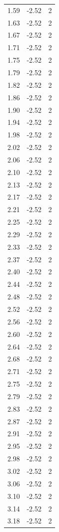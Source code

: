 \begin{longtable}{lrr}
  1.59 & -2.52 & 2 \\
  1.63 & -2.52 & 2 \\
  1.67 & -2.52 & 2 \\
  1.71 & -2.52 & 2 \\
  1.75 & -2.52 & 2 \\
  1.79 & -2.52 & 2 \\
  1.82 & -2.52 & 2 \\
  1.86 & -2.52 & 2 \\
  1.90 & -2.52 & 2 \\
  1.94 & -2.52 & 2 \\
  1.98 & -2.52 & 2 \\
  2.02 & -2.52 & 2 \\
  2.06 & -2.52 & 2 \\
  2.10 & -2.52 & 2 \\
  2.13 & -2.52 & 2 \\
  2.17 & -2.52 & 2 \\
  2.21 & -2.52 & 2 \\
  2.25 & -2.52 & 2 \\
  2.29 & -2.52 & 2 \\
  2.33 & -2.52 & 2 \\
  2.37 & -2.52 & 2 \\
  2.40 & -2.52 & 2 \\
  2.44 & -2.52 & 2 \\
  2.48 & -2.52 & 2 \\
  2.52 & -2.52 & 2 \\
  2.56 & -2.52 & 2 \\
  2.60 & -2.52 & 2 \\
  2.64 & -2.52 & 2 \\
  2.68 & -2.52 & 2 \\
  2.71 & -2.52 & 2 \\
  2.75 & -2.52 & 2 \\
  2.79 & -2.52 & 2 \\
  2.83 & -2.52 & 2 \\
  2.87 & -2.52 & 2 \\
  2.91 & -2.52 & 2 \\
  2.95 & -2.52 & 2 \\
  2.98 & -2.52 & 2 \\
  3.02 & -2.52 & 2 \\
  3.06 & -2.52 & 2 \\
  3.10 & -2.52 & 2 \\
  3.14 & -2.52 & 2 \\
  3.18 & -2.52 & 2 \\

\end{longtable}
